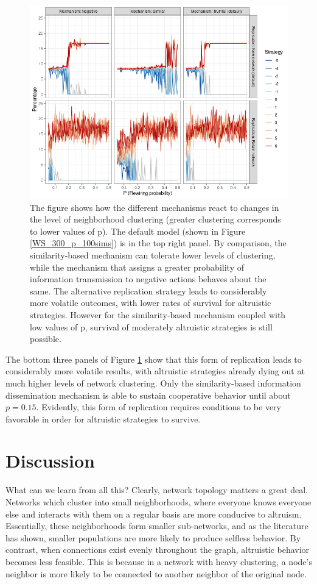 \documentclass{JASSS}
\begin{document}
\begin{figure}
	\centering
	\includegraphics[width=\linewidth]{./figures/results_vary_mechanisms.png}
	\caption{The figure shows how the different mechanisms react to changes in the level of neighborhood clustering (greater clustering corresponds to lower values of p). The default model (shown in Figure \ref{WS_300_p_100sims}) is in the top right panel. By comparison, the similarity-based mechanism can tolerate lower levels of clustering, while the mechanism that assigns a greater probability of information transmission to negative actions behaves about the same. The alternative replication strategy leads to considerably more volatile outcomes, with lower rates of survival for altruistic strategies. However for the similarity-based mechanism coupled with low values of p, survival of moderately altruistic strategies is still possible.}
	\label{vary_mechanisms}
\end{figure}

The bottom three panels of Figure \ref{vary_mechanisms} show that this form of replication leads to considerably more volatile results, with altruistic strategies already dying out at much higher levels of network clustering. Only the similarity-based information dissemination mechanism is able to sustain cooperative behavior until about $p=0.15$. Evidently, this form of replication requires conditions to be very favorable in order for altruistic strategies to survive.

\section{Discussion}
What can we learn from all this? Clearly, network topology matters a great deal. Networks which cluster into small neighborhoods, where everyone knows everyone else and interacts with them on a regular basis are more conducive to altruism. Essentially, these neighborhoods form smaller sub-networks, and as the literature has shown, smaller populations are more likely to produce selfless behavior. By contrast, when connections exist evenly throughout the graph, altruistic behavior becomes less feasible. This is because in a network with heavy clustering, a node's neighbor is more likely to be connected to another neighbor of the original node.
\end{document}
